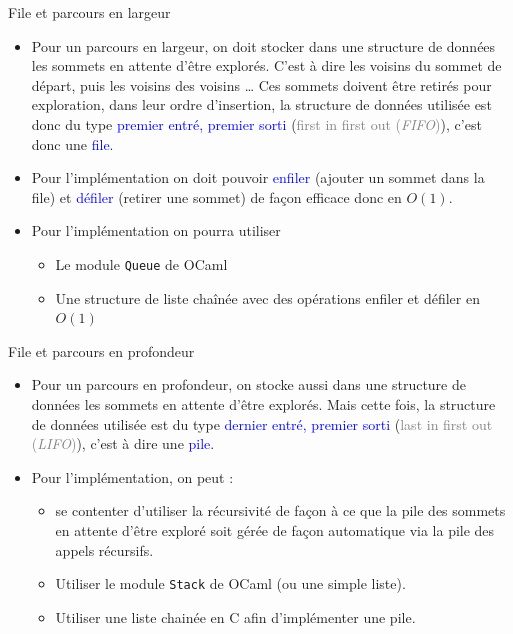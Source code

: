 \documentclass[10pt]{beamer}
\begin{document}
\begin{frame}[fragile]{\Ctitle}{\stitle}
	\begin{block}{File et parcours en largeur}
		\begin{itemize}
			\item<1-> Pour un parcours en largeur, on doit stocker dans une structure de données les sommets en attente d'être explorés. C'est à dire les voisins du sommet de départ, puis les voisins des voisins \dots 
			Ces sommets doivent être retirés pour exploration, dans leur ordre d'insertion, la structure de données utilisée est donc du type \textcolor{blue}{premier entré, premier sorti} (\textcolor{gray}{first in first out (\textit{FIFO})}), c'est donc une \textcolor{blue}{file}.
			\item<3-> Pour l'implémentation on doit pouvoir \textcolor{blue}{enfiler} (ajouter un sommet dans la file) et \textcolor{blue}{défiler} (retirer une sommet) de façon efficace donc en $O(1)$. 
			\item<4-> Pour l'implémentation on pourra utiliser
			\begin{itemize}
				\item<5-> Le module \texttt{Queue} de OCaml
				\item<6-> Une structure de liste chaînée avec des opérations enfiler et défiler en $O(1)$
			\end{itemize} 
		\end{itemize}
	\end{block}
\end{frame}

\begin{frame}[fragile]{\Ctitle}{\stitle}
	\begin{block}{File et parcours en profondeur}
		\begin{itemize}
			\item<1-> Pour un parcours en profondeur, on stocke aussi dans une structure de données les sommets en attente d'être explorés. Mais cette fois, la structure de données utilisée est  du type \textcolor{blue}{dernier entré, premier sorti} (\textcolor{gray}{last in first out (\textit{LIFO})}), c'est à dire une \textcolor{blue}{pile}.
			\item<3-> Pour l'implémentation, on peut :
			\begin{itemize}
				\item<4->se contenter d'utiliser la récursivité de façon à ce que la pile des sommets en attente d'être exploré soit gérée de façon automatique via la pile des appels récursifs.
				\item<5->Utiliser le module \texttt{Stack} de OCaml (ou une simple liste).
				\item<6->Utiliser une liste chainée en C afin d'implémenter une pile.
			\end{itemize}
		\end{itemize}
	\end{block}
\end{frame}
\end{document}
